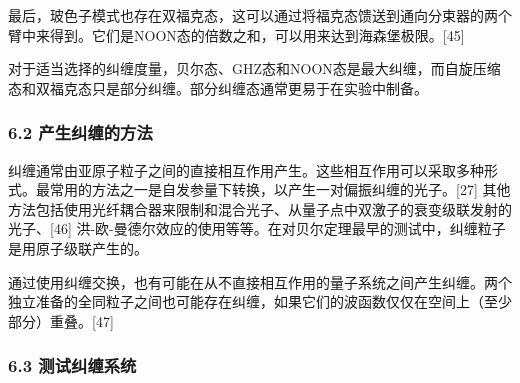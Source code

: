 最后，玻色子模式也存在双福克态，这可以通过将福克态馈送到通向分束器的两个臂中来得到。它们是NOON态的倍数之和，可以用来达到海森堡极限。[45]

对于适当选择的纠缠度量，贝尔态、GHZ态和NOON态是最大纠缠，而自旋压缩态和双福克态只是部分纠缠。部分纠缠态通常更易于在实验中制备。

\subsubsection{6.2 产生纠缠的方法}
纠缠通常由亚原子粒子之间的直接相互作用产生。这些相互作用可以采取多种形式。最常用的方法之一是自发参量下转换，以产生一对偏振纠缠的光子。[27] 其他方法包括使用光纤耦合器来限制和混合光子、从量子点中双激子的衰变级联发射的光子、[46] 洪-欧-曼德尔效应的使用等等。在对贝尔定理最早的测试中，纠缠粒子是用原子级联产生的。

通过使用纠缠交换，也有可能在从不直接相互作用的量子系统之间产生纠缠。两个独立准备的全同粒子之间也可能存在纠缠，如果它们的波函数仅仅在空间上（至少部分）重叠。[47]

\subsubsection{6.3 测试纠缠系统}
